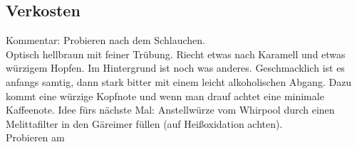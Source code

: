 \documentclass[12pt,oneside,a4paper]{scrartcl}
\begin{document}
\subsection*{Verkosten}
	\begin{adjustwidth}{2cm}{0cm}
	\hspace{-1cm}Kommentar: Probieren nach dem Schlauchen.\\
	Optisch hellbraun mit feiner Trübung. Riecht etwas nach Karamell und etwas würzigem Hopfen. Im Hintergrund ist noch was anderes. Geschmacklich ist es anfangs samtig, dann stark bitter mit einem leicht alkoholischen Abgang. Dazu kommt eine würzige Kopfnote und wenn man drauf achtet eine minimale Kaffeenote. Idee fürs nächste Mal: Anstellwürze vom Whirpool durch einen Melittafilter in den Gäreimer füllen (auf Heißoxidation achten).\\
	Probieren am \\
	\end{adjustwidth}
\end{document}
